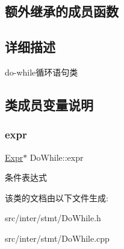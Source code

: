 \subsection*{额外继承的成员函数}


\subsection{详细描述}
do-\/while循环语句类 

\subsection{类成员变量说明}
\mbox{\label{class_do_while_a55d5ffb9c6bee10f8375f028705e4901}} 
\subsubsection{\texorpdfstring{expr}{expr}}
{\footnotesize\ttfamily \hyperlink{class_expr}{Expr}$\ast$ Do\+While\+::expr}

条件表达式 

该类的文档由以下文件生成\+:\begin{DoxyCompactItemize}
\item 
src/inter/stmt/Do\+While.\+h\item 
src/inter/stmt/Do\+While.\+cpp\end{DoxyCompactItemize}

